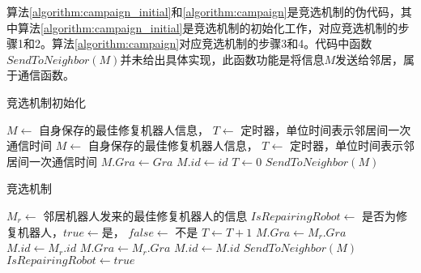 算法\ref{algorithm:campaign_initial}和\ref{algorithm:campaign}是竞选机制的伪代码，其中算法\ref{algorithm:campaign_initial}是竞选机制的初始化工作，对应竞选机制的步骤1和2。算法\ref{algorithm:campaign}对应竞选机制的步骤3和4。代码中函数$SendToNeighbor(M)$并未给出具体实现，此函数功能是将信息$M$发送给邻居，属于通信函数。
\begin{algorithm}
	\caption{竞选机制初始化}
	\label{algorithm:campaign_initial}
	\begin{algorithmic}[1]
		\Require $M \leftarrow$ 自身保存的最佳修复机器人信息， $T \leftarrow$ 定时器，单位时间表示邻居间一次通信时间
		\Ensure $M \leftarrow$ 自身保存的最佳修复机器人信息， $T \leftarrow$ 定时器，单位时间表示邻居间一次通信时间
			\State $M.Gra \gets Gra$
			\State $M.id \gets id$
			\State $T \gets 0$
			\State $SendToNeighbor(M)$
			\State {}
		\EndFunction
	\end{algorithmic}	
\end{algorithm}

\begin{algorithm}
	\caption{竞选机制}
	\label{algorithm:campaign}
	\begin{algorithmic}[1]
		\Require $M_r \leftarrow$ 邻居机器人发来的最佳修复机器人的信息
		\Ensure $IsRepairingRobot \leftarrow$ 是否为修复机器人，$true \leftarrow $是， $ false \leftarrow$ 不是
			\State $T \gets T+1$				
				\State $M.Gra \gets M_r.Gra$
				\State $M.id \gets M_r.id$		
			\Else 
						\State $M.Gra \gets M_r.Gra$
						\State $M.id \gets M.id$
					\EndIf
				\EndIf
				\State $SendToNeighbor(M)$
			\Else 
					\State $IsRepairingRobot \gets true$
					\State {} 
				\EndIf	
			\EndIf			
		\EndFunction		
	\end{algorithmic}
\end{algorithm}

